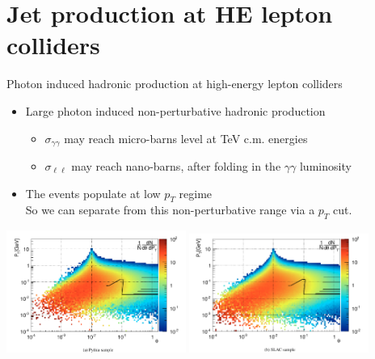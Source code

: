 \documentclass[aspectratio=169]{beamer}
\begin{document}
\section{Jet production at HE lepton colliders}
\begin{frame}{Photon induced hadronic production at high-energy lepton colliders}
	\begin{itemize}
		\item Large photon induced non-perturbative hadronic production \\
		\begin{itemize}
			\item $\sigma_{\gamma \gamma}$ may reach micro-barns level at TeV c.m. energies
			\item $\sigma_{\ell \ell}$ may reach nano-barns, after folding in the $\gamma \gamma$ luminosity
		\end{itemize}
		\item The events populate at low $p_T$ regime\\ \textcolor{PittRoyal}{So we can separate from this non-perturbative range via a $p_T$ cut.}
	\end{itemize}
	\includegraphics[width=0.44\textwidth]{figs/LCD1.png}
	\includegraphics[width=0.44\textwidth]{figs/LCD2.png}\\
	\vspace{-2mm}\hspace{70mm}
\end{frame}
\end{document}
